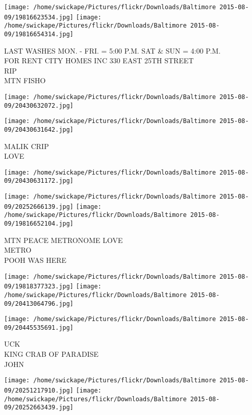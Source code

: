 \documentclass[10pt,letterpaper]{article}
\begin{document}
\texttt{[image: /home/swickape/Pictures/flickr/Downloads/Baltimore 2015-08-09/19816623534.jpg]}
\texttt{[image: /home/swickape/Pictures/flickr/Downloads/Baltimore 2015-08-09/19816654314.jpg]}

LAST WASHES MON. {-} FRI. = 5:00 P.M. SAT \& SUN = 4:00 P.M.\\
FOR RENT CITY HOMES INC 330 EAST 25TH STREET\\
RIP\\
MTN FISHO
\pagebreak

\texttt{[image: /home/swickape/Pictures/flickr/Downloads/Baltimore 2015-08-09/20430632072.jpg]}

\vspace{0.25in}
\texttt{[image: /home/swickape/Pictures/flickr/Downloads/Baltimore 2015-08-09/20430631642.jpg]}

MALIK CRIP\\
LOVE
\pagebreak

\texttt{[image: /home/swickape/Pictures/flickr/Downloads/Baltimore 2015-08-09/20430631172.jpg]}

\vspace{0.25in}
\texttt{[image: /home/swickape/Pictures/flickr/Downloads/Baltimore 2015-08-09/20252666139.jpg]}
\texttt{[image: /home/swickape/Pictures/flickr/Downloads/Baltimore 2015-08-09/19816652104.jpg]}

MTN PEACE METRONOME LOVE\\
METRO\\
POOH WAS HERE
\pagebreak

\texttt{[image: /home/swickape/Pictures/flickr/Downloads/Baltimore 2015-08-09/19818377323.jpg]}
\texttt{[image: /home/swickape/Pictures/flickr/Downloads/Baltimore 2015-08-09/20413064796.jpg]}

\vspace{0.25in}
\texttt{[image: /home/swickape/Pictures/flickr/Downloads/Baltimore 2015-08-09/20445535691.jpg]}

UCK\\
KING CRAB OF PARADISE\\
JOHN
\pagebreak

\texttt{[image: /home/swickape/Pictures/flickr/Downloads/Baltimore 2015-08-09/20251217910.jpg]}
\texttt{[image: /home/swickape/Pictures/flickr/Downloads/Baltimore 2015-08-09/20252663439.jpg]}
\end{document}
